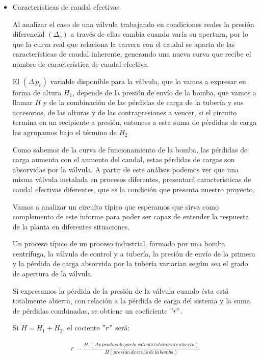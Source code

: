 \begin{itemize}
  \item Características de caudal efectivas
  
  Al analizar el caso de una válvula trabajando en condiciones reales la 
  presión diferencial ${(\Delta_v)}$ a través de ellas cambia cuando varía su
  apertura, por lo que la curva real que relaciona la carrera con el caudal
  se aparta de las características de caudal inherente, generando una nueva 
  curva que recibe el nombre de característica de caudal efectiva.
  
  El ${(\Delta \,p_v)}$ variable disponíble para la válvula, que lo vamos a 
  expresar en forma de altura ${H_1}$, depende de la presión de envío de la 
  bomba, que vamos a llamar ${H}$ y de la combinación de las pérdidas de carga
  de la tubería y sus accesorios, de las alturas y de las contrapresiones a 
  vencer, si el circuito termina en un recipiente a presión, entonces a esta 
  suma de pérdidas de carga las agrupamos bajo el término de ${H_2}$
  
  Como sabemos de la curva de funcionamiento de la bomba, las pérdidas de carga
  aumenta con el aumento del caudal, estas pérdidas de cargas son absorvidas 
  por la válvula.
  A partir de este análisis podemos ver que una misma válvula instalada en
  procesos diferentes, presentará características de caudal efectivas diferentes,
  que es la condición que presenta nuestro proyecto.
  
  Vamos a analizar un circuíto típico que esperamos que sirva como complemento
  de este informe para poder ser capaz de entender la respuesta de la planta en 
  diferentes situaciones.
  
  Un proceso típico de un proceso industrial, formado por una bomba centrífuga, 
  la válvula de control y a tubería, la presión de envío de la primera y la pérdida
  de carga absorvida por la tubería variarían segúm sea el grado de apertura 
  de la válvula.
  
  Si expresamos la pérdida de la presión de la válvula cuando ésta está totalmente
  abierta, con relación a la pérdida de carga del sistema y la suma de pérdidas 
  combinadas, se obtiene un coeficiente ${"r"}$.
  
  Si ${H = H_1 + H_2}$, el cociente ${"r"}$ será:
  
  \begin{align}
	r = \frac{H_1(\Delta p \, producido\, por\, la\, válvula\, totalmente\, abierta)}
	{H(presión\,de\,envío\,de\,la\,bomba)}
    \end{align}
    

\end{itemize}
